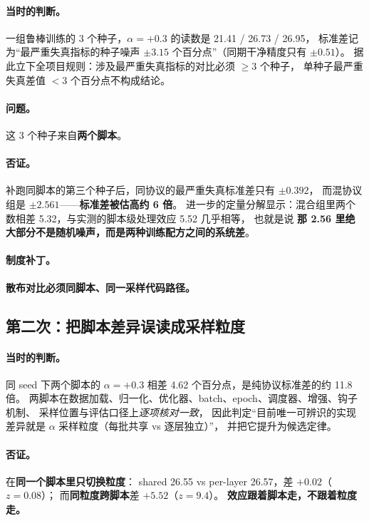 \documentclass[11pt,a4paper]{ctexart}
\begin{document}
\paragraph{当时的判断。}
一组鲁棒训练的 3 个种子，$\alpha=+0.3$ 的读数是 21.41 / 26.73 / 26.95，
标准差记为“最严重失真指标的种子噪声 $\pm3.15$ 个百分点”（同期干净精度只有 $\pm0.51$）。
据此立下全项目规则：涉及最严重失真指标的对比必须 $\ge3$ 个种子，
单种子最严重失真差值 $<3$ 个百分点不构成结论。

\paragraph{问题。}
这 3 个种子来自\textbf{两个脚本}。

\paragraph{否证。}
补跑同脚本的第三个种子后，同协议的最严重失真标准差只有 $\pm0.392$，
而混协议组是 $\pm2.561$——\textbf{标准差被估高约 6 倍}。
进一步的定量分解显示：混合组里两个数相差 5.32，与实测的脚本级处理效应 5.52 几乎相等，
也就是说 \textbf{那 2.56 里绝大部分不是随机噪声，而是两种训练配方之间的系统差}。

\paragraph{制度补丁。}
\textbf{散布对比必须同脚本、同一采样代码路径。}

\subsection{第二次：把脚本差异误读成采样粒度}

\paragraph{当时的判断。}
同 seed 下两个脚本的 $\alpha=+0.3$ 相差 4.62 个百分点，是纯协议标准差的约 11.8 倍。
两脚本在数据加载、归一化、优化器、batch、epoch、调度器、增强、钩子机制、
采样位置与评估口径上\emph{逐项核对一致}，
因此判定“目前唯一可辨识的实现差异就是 $\alpha$ 采样粒度（每批共享 vs 逐层独立）”，
并把它提升为候选定律。

\paragraph{否证。}
在\textbf{同一个脚本里只切换粒度}：
shared 26.55 vs per-layer 26.57，差 $+0.02$（$z=0.08$）；
而\textbf{同粒度跨脚本}差 $+5.52$（$z=9.4$）。
\textbf{效应跟着脚本走，不跟着粒度走。}
\end{document}

